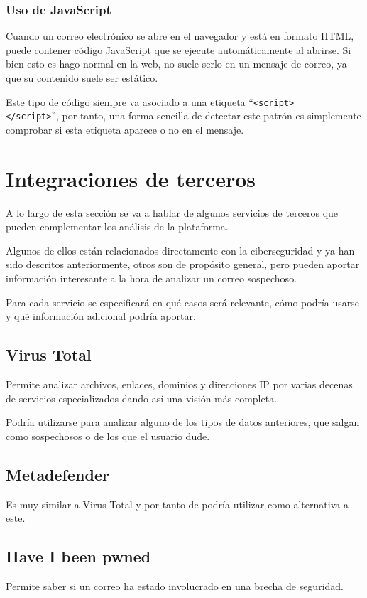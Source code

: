 \subsubsection{Uso de JavaScript}
Cuando un correo electrónico se abre en el navegador y está en formato HTML, puede contener código JavaScript que se ejecute automáticamente al abrirse. Si bien esto es hago normal en la web, no suele serlo en un mensaje de correo, ya que su contenido suele ser estático. 

Este tipo de código siempre va asociado a una etiqueta ``\verb|<script>|\\\verb|</script>|'', por tanto, una forma sencilla de detectar este patrón es simplemente comprobar si esta etiqueta aparece o no en el mensaje. 

\section{Integraciones de terceros}
A lo largo de esta sección se va a hablar de algunos servicios de terceros que pueden complementar los análisis de la plataforma. 

Algunos de ellos están relacionados directamente con la ciberseguridad y ya han sido descritos anteriormente, otros son de propósito general, pero pueden aportar información interesante a la hora de analizar un correo sospechoso. 

Para cada servicio se especificará en qué casos será relevante, cómo podría usarse y qué información adicional podría aportar.

\subsection{Virus Total}
Permite analizar archivos, enlaces, dominios y direcciones IP por varias decenas de servicios especializados dando así una visión más completa. 

Podría utilizarse para analizar alguno de los tipos de datos anteriores, que salgan como sospechosos o de los que el usuario dude.

\subsection{Metadefender}
Es muy similar a Virus Total y por tanto de podría utilizar como alternativa a este. 

\subsection{Have I been pwned}
Permite saber si un correo ha estado involucrado en una brecha de seguridad. 


